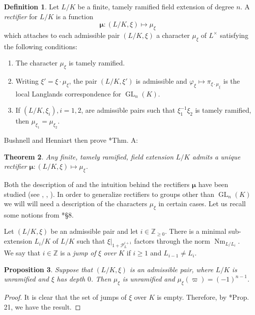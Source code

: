 \documentclass{compositio}
\theoremstyle{plain}
\newtheorem{theorem}{Theorem}[section]
\newtheorem{proposition}[theorem]{Proposition}
\theoremstyle{definition}
\newtheorem{definition}[theorem]{Definition}
\numberwithin{equation}{section}
\DeclareMathOperator{\Nm}{Nm}
\DeclareMathOperator{\GL}{GL}
\newcommand{\PL}{\mathcal{P}_L}
\newcommand{\ZZ}{\mathbb{Z}}
\newcommand{\bmu}{\boldsymbol\mu}
\begin{document}
\begin{definition}\label{rectifierbushnellhenniart}
Let $L/K$ be a finite, tamely ramified field extension of degree $n$.  A \emph{rectifier}
for $L/K$ is a function
$$\bmu : (L/K, \xi) \mapsto \mu_{\xi}$$
which attaches to each admissible pair $(L/K, \xi)$ a character $\mu_{\xi}$ of $L^{\times}$
satisfying the following conditions:
\begin{enumerate}
\item The character $\mu_{\xi}$ is tamely ramified.
\item Writing $\xi' = \xi \cdot \mu_{\xi}$, the pair $(L/K, \xi')$ is admissible and
$\varphi_{\xi} \mapsto \pi_{\xi \cdot \mu_{\xi}}$ is the local Langlands correspondence
for $\GL_n(K)$.
\item If $(L/K, \xi_i), i = 1,2$, are admissible pairs such that $\xi_1^{-1} \xi_2$ is
tamely ramified, then $ \mu_{\xi_1} =  \mu_{\xi_2}$.
\end{enumerate}
\end{definition}

Bushnell and Henniart then prove \cite{bushnell-henniart:10a}*{Thm. A}:

\begin{theorem}
Any finite, tamely ramified, field extension $L/K$ admits a unique rectifier
$\bmu : (L/K, \xi) \mapsto \mu_{\xi}$.
\end{theorem}

Both the description of and the
intuition behind the rectifiers $\bmu$ have been
studied (see \cite{bushnell-henniart:10a}, \cite{tam:12a}, \cite{adrian:13a}).  In order to
generalize rectifiers to groups other than $\GL_n(K)$ we
will will need a description of the characters $\mu_{\xi}$ in certain cases.
Let us recall some notions from \cite{bushnell-henniart:10a}*{\S 8}.

Let $(L/K,\xi)$ be an admissible pair and let $i \in \ZZ_{\ge 0}$.
There is a minimal sub-extension $L_i/K$ of $L/K$ such that
$\xi|_{1 + \PL^{i+1}}$ factors through the norm $\Nm_{L/L_i}$.  We say that $i \in \mathbb{Z}$
is a \emph{jump of} $\xi$ \emph{over} $K$ if $i \geq 1$ and $L_{i-1} \neq L_i$.

\begin{proposition}\label{prop:BH_result1}
  Suppose that $(L/K, \xi)$ is an admissible pair, where $L/K$
  is unramified and $\xi$ has depth $0$.
  Then $\mu_{\xi}$ is unramified and
  $\mu_{\xi}(\varpi) = (-1)^{n-1}$.
\end{proposition}

\begin{proof}
It is clear that the set of jumps of $\xi$ over $K$ is empty.
Therefore, by \cite{bushnell-henniart:10a}*{Prop. 21}, we have the result.
\end{proof}
\end{document}
